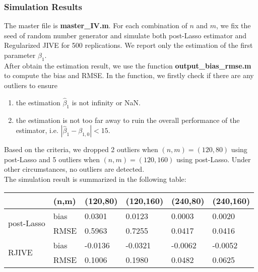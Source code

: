\documentclass[12pt, a4paper]{article}
\begin{document}
\subsubsection*{Simulation Results}
The master file is \textbf{master\_IV.m}. For each combination of $n$ and $m$, we fix the seed of random number generator and simulate both post-Lasso estimator and Regularized JIVE for 500 replications. We report only the estimation of the first parameter $\beta_1$.\\
\noindent After obtain the estimation result, we use the function \textbf{output\_bias\_rmse.m} to compute the bias and RMSE. In the function, we firstly check if there are any outliers to ensure
\begin{enumerate}
	\item the estimation $\hat{\beta}_1$ is not infinity or NaN.
	\item the estimation is not too far away to ruin the overall performance of the estimator, i.e. $ |\hat{\beta}_1 - \beta_{1,0} | < 15$.
\end{enumerate}
Based on the criteria, we dropped 2 outliers when $(n,m) = (120,80)$ using post-Lasso and 5 outliers when $(n,m) = (120,160)$ using post-Lasso. Under other circumstances, no outliers are detected.\\

\noindent The simulation result is summarized in the following table:\\

\begin{tabular}{ |p{1.5cm}|p{1.8cm}|p{1.8cm}|p{1.8cm}|p{1.8cm}|p{1.8cm}|  }
	\hline
	&(n,m) & (120,80) & (120,160) & (240,80) & (240,160)\\
	\hline
	\multirow{2}{0pt}{post-Lasso} & bias & 0.0301 & 0.0123 &	0.0003 & 0.0020\\
	& RMSE & 0.5963 & 0.7255 & 0.0417 & 0.0416\\
	\hline
	\multirow{2}{0pt}{RJIVE} & bias & -0.0136 & -0.0321 & -0.0062 & -0.0052\\
	& RMSE & 0.1006 & 0.1980 & 0.0482 &	0.0625\\
	\hline
\end{tabular}

\newpage


\end{document}
